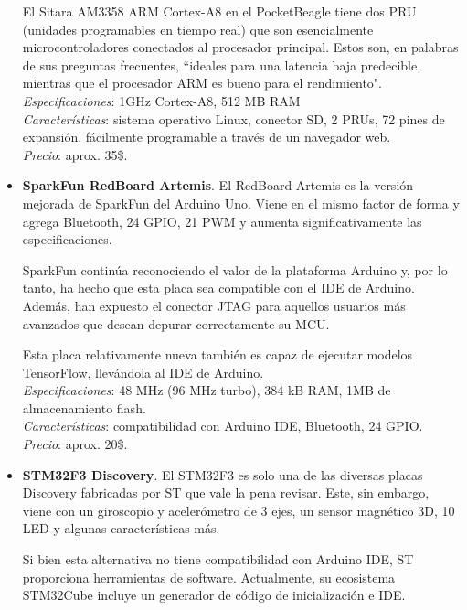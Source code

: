 \documentclass[12pt]{article}
\begin{document}
\begin{itemize}
		El Sitara AM3358 ARM Cortex-A8 en el PocketBeagle tiene dos PRU (unidades programables en tiempo real) que son esencialmente microcontroladores conectados al procesador principal. Estos son, en palabras de sus preguntas frecuentes, ``ideales para una latencia baja predecible, mientras que el procesador ARM es bueno para el rendimiento". \\
		
		\textit{Especificaciones}: 1GHz Cortex-A8, 512 MB RAM\\
		
		\textit{Características}: sistema operativo Linux, conector SD, 2 PRUs, 72 pines de expansión, fácilmente programable a través de un navegador web.\\
		
		\textit{Precio}: aprox. 35\$. \\
		
		\item \textbf{SparkFun RedBoard Artemis}. El RedBoard Artemis es la versión mejorada de SparkFun del Arduino Uno. Viene en el mismo factor de forma y agrega Bluetooth, 24 GPIO, 21 PWM y aumenta significativamente las especificaciones.
		
		SparkFun continúa reconociendo el valor de la plataforma Arduino y, por lo tanto, ha hecho que esta placa sea compatible con el IDE de Arduino. Además, han expuesto el conector JTAG para aquellos usuarios más avanzados que desean depurar correctamente su MCU.
		
		Esta placa relativamente nueva también es capaz de ejecutar modelos TensorFlow, llevándola al IDE de Arduino.  \\
		
		\textit{Especificaciones}: 48 MHz (96 MHz turbo), 384 kB RAM, 1MB de almacenamiento flash. \\
		
		\textit{Características}: compatibilidad con Arduino IDE, Bluetooth, 24 GPIO.\\
		
		\textit{Precio}: aprox. 20\$.\\
		
		\item \textbf{STM32F3 Discovery}. El STM32F3 es solo una de las diversas placas Discovery fabricadas por ST que vale la pena revisar. Este, sin embargo, viene con un giroscopio y acelerómetro de 3 ejes, un sensor magnético 3D, 10 LED y algunas características más.
		
		Si bien esta alternativa no tiene compatibilidad con Arduino IDE, ST proporciona herramientas de software. Actualmente, su ecosistema STM32Cube incluye un generador de código de inicialización e IDE. \\
		

\end{itemize}
\end{document}
